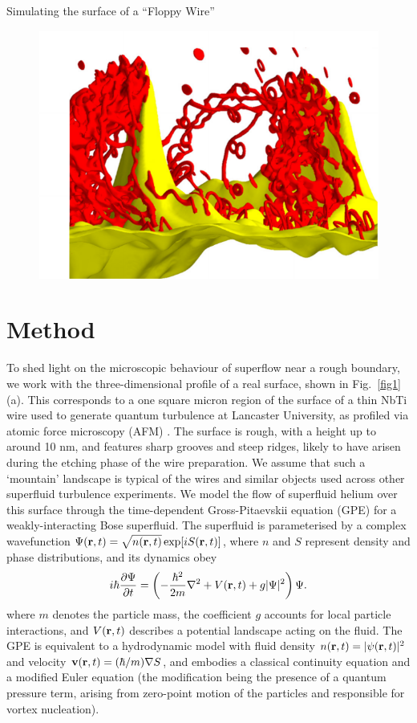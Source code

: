 \begin{chapter}{\label{cha:afm}Simulating the surface of a ``Floppy Wire''}
\begin{figure}[!ht]
{\begin{minipage}{1.1\textwidth}
  \includegraphics[width=0.3\linewidth]{./afm/afm-sub-10101}
  \end{minipage}
  }
  \caption{}
 \end{figure}


\section{Method}
To shed light on the microscopic behaviour of superflow near a rough
boundary, we work with the three-dimensional profile of a real surface, shown in Fig.~\ref{fig1}(a).  This corresponds to a one square micron region of the surface of a thin NbTi wire used to generate quantum turbulence at Lancaster University, as profiled via atomic force microscopy (AFM) \cite{Lawson}.  The surface is rough, with a height up to around 10 nm, and features sharp grooves and steep ridges, likely to have arisen during the etching phase of the wire preparation.    We assume that such a `mountain'  landscape is typical of the wires and similar objects used across other superfluid turbulence experiments.  We model the flow of
superfluid helium over this surface through the time-dependent Gross-Pitaevskii equation \cite{RobertsBerloff-GPE} (GPE) for a weakly-interacting Bose superfluid.  The superfluid is parameterised by a complex wavefunction $\Psi({\bf r},t)=\sqrt{n({\bf r},t)}\exp[i S({\bf r},t)]$, where $n$ and $S$ represent density and phase distributions, and its dynamics obey
\begin{equation}
i \hbar \frac{\partial\Psi}{\partial t} 
= \left(-\frac{\hbar^2}{2m}\nabla^2 + V({\bf r},t) + g|\Psi|^2 \right) \Psi.
\end{equation}
where $m$ denotes the particle mass, the coefficient $g$ accounts for local particle interactions, and $V({\bf r},t)$ describes a potential landscape acting on the fluid.  
The GPE is equivalent to a hydrodynamic model with fluid 
density $n({\bf r},t)=|\psi({\bf r},t)|^2$ and velocity 
${\bf v}({\bf r},t)=(\hbar/m)\nabla S$, and embodies a classical 
continuity equation and a modified Euler equation (the modification being 
the presence of a quantum pressure term, arising from zero-point motion 
of the particles {and responsible for vortex nucleation}).  

\end{chapter}
